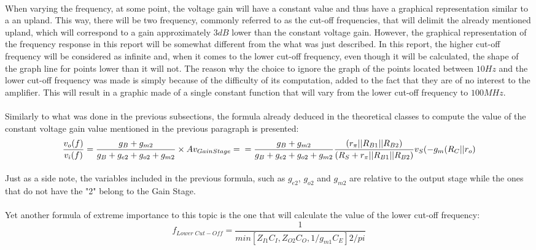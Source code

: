 \paragraph{}When varying the frequency, at some point, the voltage gain will have a constant value and thus have a graphical representation similar to a an upland. This way, there will be two frequency, commonly referred to as the cut-off frequencies, that will delimit the already mentioned upland, which will correspond to a gain approximately $3dB$ lower than the constant voltage gain. However, the graphical representation of the frequency response in this report will be somewhat different from the what was just described. In this report, the higher cut-off frequency will be considered as infinite and, when it comes to the lower cut-off frequency, even though it will be calculated, the shape of the graph line for points lower than it will not. The reason why the choice to ignore the graph of the points located between $10Hz$ and the lower cut-off frequency was made is simply because of the difficulty of its computation, added to the fact that they are of no interest to the amplifier. This will result in a graphic made of a single constant function that will vary from the lower cut-off frequency to $100MHz$.  
\paragraph{}Similarly to what was done in the previous subsections, the formula already deduced in the theoretical classes to compute the value of the constant voltage gain value mentioned in the previous paragraph is presented:
\begin{equation}
    \frac{v_o(f)}{v_i(f)}=\frac{g_B+g_{m2}}{g_B+g_{e2}+g_{o2}+g_{m2}}\times Av_{Gain Stage}= \\ =\frac{g_B+g_{m2}}{g_B+g_{e2}+g_{o2}+g_{m2}}\frac{(r_\pi||R_{B1}||R_{B2})}{(R_S+r_\pi||R_{B1}||R_{B2})}
    v_S(-g_m(R_C||r_o)
\end{equation}
\paragraph{} Just as a side note, the variables included in the previous formula, such as $g_{e2}$, $g_{o2}$ and $g_{m2}$ are relative to the output stage while the ones that do not have the "2" belong to the Gain Stage.
\paragraph{}Yet another formula of extreme importance to this topic is the one that will calculate the value of the lower cut-off frequency:
\begin{equation}
	f_{Lower \; Cut-Off}=\frac{1}{min[Z_{I1}C_I,Z_{O2}C_O,1/g_{m1}C_E] 2 /pi}
\end{equation} 






